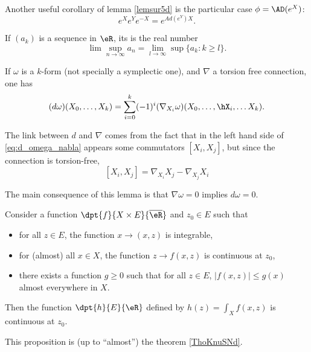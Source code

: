 \begin{corollary}
Another useful corollary of lemma \ref{lemsur5d} is the particular case $\phi=\AD(e^X)$:
\[
   e^Xe^Ye^{-X}=e^{Ad(e^Y)X}.
\]
\label{cor:eXeYe-X}
\end{corollary}

\begin{definition}
If $(a_k)$ is a sequence in $\eR$, its  is the real number
\[
  \lim\sup_{n\to\infty}a_n=\lim_{l\to\infty}\sup\{a_k:k\geq l\}.
\]
\end{definition}

\begin{lemma}
If $\omega$ is a $k$-form (not specially a symplectic one), and $\nabla$ a torsion free connection, one has
\begin{equation}\label{eq:d_omega_nabla}
  (d\omega)(X_0,\ldots,X_k)=\sum_{i=0}^k (-1)^i(\nabla_{X_i}\omega)(X_0,\ldots,\hX_i,\ldots X_k).
\end{equation}
\end{lemma}

\begin{remark}
The link between $d$ and $\nabla$ comes from the fact that in the left hand side of \eqref{eq:d_omega_nabla} appears some commutators $[X_i,X_j]$, but since the connection is torsion-free,
\[
  [X_i,X_j]=\nabla_{X_i}X_j-\nabla_{X_j}X_i
\]
\end{remark}
The main consequence of this lemma is that $\nabla\omega=0$ implies $d\omega=0$. 

\begin{proposition} \label{prop:fdefint}
    Consider a function $\dpt{f}{X\times E}{\overline{\eR}}$ and $z_0\in E$ such that
    \begin{itemize}
        \item for all $z\in E$, the function $x\to(x,z)$ is integrable,
        \item for (almost) all $x\in X$, the function $z\to f(x,z)$ is continuous at $z_0$,
        \item there exists a function $g\geq 0$ such that for all $z\in E$, $| f(x,z) |\leq g(x)$ almost everywhere in $X$.
    \end{itemize}
    Then the function $\dpt{h}{E}{\eR}$ defined by $h(z)=\int_Xf(x,z)$ is continuous at $z_0$.
\end{proposition}
This proposition is (up to ``almost'') the theorem \ref{ThoKnuSNd}.


